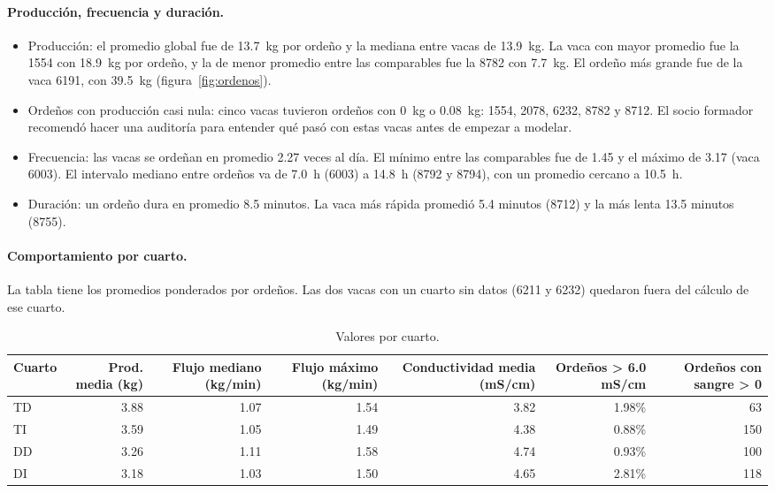 \documentclass[11pt,letterpaper,DIV=12]{scrartcl}
\begin{document}
\paragraph{Producción, frecuencia y duración.}
\begin{itemize}
  \item Producción: el promedio global fue de 13.7~kg por ordeño y la mediana entre vacas de 13.9~kg. La vaca con mayor promedio fue la 1554 con 18.9~kg por ordeño, y la de menor promedio entre las comparables fue la 8782 con 7.7~kg. El ordeño más grande fue de la vaca 6191, con 39.5~kg (figura~\ref{fig:ordenos}).
  \item Ordeños con producción casi nula: cinco vacas tuvieron ordeños con 0~kg o 0.08~kg: 1554, 2078, 6232, 8782 y 8712. El socio formador recomendó hacer una auditoría para entender qué pasó con estas vacas antes de empezar a modelar.
  \item Frecuencia: las vacas se ordeñan en promedio 2.27 veces al día. El mínimo entre las comparables fue de 1.45 y el máximo de 3.17 (vaca 6003). El intervalo mediano entre ordeños va de 7.0~h (6003) a 14.8~h (8792 y 8794), con un promedio cercano a 10.5~h.
  \item Duración: un ordeño dura en promedio 8.5 minutos. La vaca más rápida promedió 5.4 minutos (8712) y la más lenta 13.5 minutos (8755). 
\end{itemize}

\paragraph{Comportamiento por cuarto.} La tabla tiene los promedios ponderados por ordeños. Las dos vacas con un cuarto sin datos (6211 y 6232) quedaron fuera del cálculo de ese cuarto.

\begin{small}
\begin{longtable}{lrrrrrr}
\caption{Valores por cuarto.}\\
\toprule
Cuarto & Prod. media (kg) & Flujo mediano (kg/min) & Flujo máximo (kg/min) & Conductividad media (mS/cm) & Ordeños > 6.0 mS/cm & Ordeños con sangre > 0 \\
\midrule
\endfirsthead
\bottomrule
\endfoot
TD & 3.88 & 1.07 & 1.54 & 3.82 & 1.98\% & 63 \\
TI & 3.59 & 1.05 & 1.49 & 4.38 & 0.88\% & 150 \\
DD & 3.26 & 1.11 & 1.58 & 4.74 & 0.93\% & 100 \\
DI & 3.18 & 1.03 & 1.50 & 4.65 & 2.81\% & 118 \\
\end{longtable}
\end{small}
\end{document}
